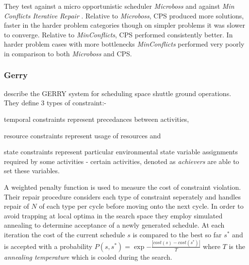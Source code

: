 
They test against a micro opportunistic scheduler \emph{Microboss} \citep{sadeh91lookahead} and against \emph{Min Conflicts Iterative Repair} \citep{minton92minconflicts}. Relative to \emph{Microboss}, CPS produced more solutions, faster in the harder problem categories though on simpler problems it was slower to converge. Relative to \emph{MinConflicts}, CPS performed consistently better. In harder problem cases with more bottlenecks \emph{MinConflicts} performed very poorly in comparison to both \emph{Microboss} and CPS. 


\subsubsection{Gerry}
\citet{zweben94scheduling} describe the GERRY system for scheduling space shuttle ground operations. They define 3 types of constraint:- \begin{inparaenum} \item temporal constraints represent precedances between activities, \item resource constraints represent usage of resources and \item state constraints represent particular environmental state variable assignments required by some activities - certain activities, denoted as \emph{achievers} are able to set these variables. \end{inparaenum} A weighted penalty function is used to measure the cost of constraint violation. Their repair procedure considers each type of constraint seperately and handles repair of $N$ of each type per cycle before moving onto the next cycle. In order to avoid trapping at local optima in the search space they employ simulated annealing to determine acceptance of a newly generated schedule. At each iteration the cost of the current schedule $s$ is compared to the best so far $s^*$ and is accepted with a probability $P(s,s^*) = \exp{-\frac{|cost(s)-cost(s^*)|}{T}}$ where $T$ is the \emph{annealing temperature} which is cooled during the search. 

